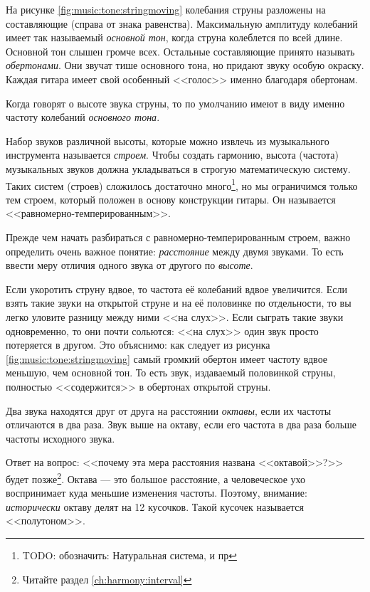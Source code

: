 На рисунке \ref{fig:music:tone:stringmoving} колебания струны разложены на составляющие (справа от знака равенства). Максимальную амплитуду колебаний имеет так называемый \emph{основной тон}, когда струна колеблется по всей длине. Основной тон слышен громче всех. Остальные составляющие принято называть \emph{обертонами}. Они звучат тише основного тона, но придают звуку особую окраску. Каждая гитара имеет свой особенный <<голос>> именно благодаря обертонам.

Когда говорят о высоте звука струны, то по умолчанию имеют в виду именно частоту колебаний \emph{основного тона}.

Набор звуков различной высоты, которые можно извлечь из музыкального инструмента называется \emph{строем}. Чтобы создать гармонию, высота (частота) музыкальных звуков должна укладываться в строгую математическую систему. Таких систем (строев) сложилось достаточно много\footnote{TODO: обозначить: Натуральная система, и пр}, но мы ограничимся только тем строем, который положен в основу конструкции гитары. Он называется <<равномерно-темперированным>>.

Прежде чем начать разбираться с равномерно-темперированным строем, важно определить очень важное понятие: \emph{расстояние} между двумя звуками. То есть ввести меру отличия одного звука от другого по \emph{высоте}. 

Если укоротить струну вдвое, то частота её колебаний вдвое увеличится. Если взять такие звуки на открытой струне и на её половинке по отдельности, то вы легко уловите разницу между ними <<на слух>>. Если сыграть такие звуки одновременно, то они почти сольются: <<на слух>> один звук просто потеряется в другом. Это объяснимо: как следует из рисунка \ref{fig:music:tone:stringmoving} самый громкий обертон имеет частоту вдвое меньшую, чем основной тон. То есть звук, издаваемый половинкой струны, полностью <<содержится>> в обертонах открытой струны.

\begin{Definition}[Октава]
    Два звука находятся друг от друга на расстоянии \emph{октавы}, если их частоты отличаются в два раза. Звук выше на октаву, если его частота в два раза больше частоты исходного звука. 
\end{Definition}

Ответ на вопрос: <<почему эта мера расстояния названа <<октавой>>?>> будет позже\footnote{Читайте раздел \ref{ch:harmony:interval}}. Октава --- это большое расстояние, а человеческое ухо воспринимает куда меньшие изменения частоты. Поэтому, внимание: \emph{исторически} октаву делят на 12 кусочков. Такой кусочек называется <<полутоном>>.

